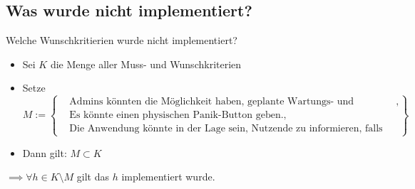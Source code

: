 \documentclass{sdqbeamer}
\begin{document}
    \subsection{Was wurde nicht implementiert?}
    \begin{frame}{Welche Wunschkritierien wurde nicht implementiert?}
        \begin{itemize}
            \item Sei $K$ die Menge aller Muss- und Wunschkriterien
            \item Setze     $
    M := \left\{
    \begin{aligned}
    &\text{Admins könnten die Möglichkeit haben, geplante Wartungs- und Sperrzeiten einzurichten}, \\
    &\text{Es könnte einen physischen Panik-Button geben.}, \\
    &\text{Die Anwendung könnte in der Lage sein, Nutzende zu informieren, falls ein gewünschter Termin frei wird.}
    \end{aligned}
    \right\}
    
    $ 
    
        \end{itemize}
        \begin{itemize}
            \item Dann gilt: $M \subset K$
        \end{itemize}  
        
        \hfill \break
        \hfill \break
        $\implies \forall h \in K \setminus M $ gilt das $h$ implementiert wurde.
    \end{frame}
    
    
\end{document}
